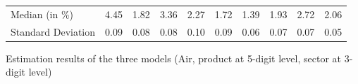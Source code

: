 \documentclass[11pt,twoside, authoryear]{elsarticle}
\begin{document}
\begin{table}[htbp]
{\begin{tabular}{l|c c c c c c c c c}
    Median (in \%)& \multicolumn{1}{c}{4.45} & \multicolumn{1}{c}{1.82} & \multicolumn{1}{c}{3.36} & \multicolumn{1}{c}{2.27} & \multicolumn{1}{c}{1.72} & \multicolumn{1}{c}{1.39} & \multicolumn{1}{c}{1.93} & \multicolumn{1}{c}{2.72} & \multicolumn{1}{c}{2.06} \\
    Standard Deviation & \multicolumn{1}{c}{0.09} & \multicolumn{1}{c}{0.08} & \multicolumn{1}{c}{0.08} & \multicolumn{1}{c}{0.10} & \multicolumn{1}{c}{0.09} & \multicolumn{1}{c}{0.06} & \multicolumn{1}{c}{0.07} & \multicolumn{1}{c}{0.07} & \multicolumn{1}{c}{0.05} \\  \hline \hline
    \end{tabular}
    }
\end{table}%

\begin{table}[htbp]
	\centering
	\footnotesize{
	\caption{Estimation results of the three models (Air, product at 5-digit level, sector at 3-digit level)}
	\label{tab:3models_estimation_results_air}%
	
}	
\end{table}%
\end{document}
